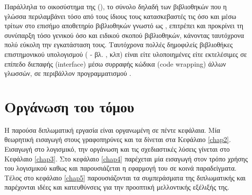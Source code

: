 Παράλληλα το οικοσύστημα της  (), το σύνολο δηλαδή των βιβλιοθηκών που η γλώσσα περιλαμβάνει τόσο από τους ίδιους τους κατασκεβαστές τις όσο και μέσω τρίτων στο επισήμο αποθετηρίο βιβλιοθηκών γνωστό ως , επιτρέπει και προκρίνει τη συνύπαρξη τόσο γενικού όσο και ειδικού σκοπού βιβλιοθηκών, κάνοντας ταυτόχρονα πολύ εύκολη την εγκατάσταση τους.
Ταυτόχρονα πολλές δημοφιλείς βιβλιοθήκες επιστημονικού υπολογισμού ( - βλ. ,  κλπ) είναι είτε υλοποιημένες είτε εκτελέσιμες σε επίπεδο διεπαφής (interface) μέσω συρραφής κώδικα (code wrapping) άλλων γλωσσών, σε περιβάλλον προγραμματισμού .

\section{Οργάνωση του τόμου}

Η παρούσα διπλωματική εργασία είναι οργανωμένη σε πέντε κεφάλαια. Μία θεωρητική εισαγωγή στους γραφοπηρύνες και τα δίνεται στα Κεφάλαιο \ref{chap2}. Εισαγωγή στο λογισμικό, την οργάνωση και τις σχεδιαστικές λύσεις γίνεται στο Κεφάλαιο \ref{chap3}. Στο κεφάλαιο \ref{chap4} παρέχεται μία εισαγωγή στον τρόπο χρήσης του λογισμικού καθως και παρουσιάζεται η εφαρμογή του σε κοινά παραδείγματα. Τέλος στο κεφάλαιο \ref{chap5} παρουσιάζονται τα συμπεράσματα της διπλωματικής και παρέχονται ιδέες και κατευθύνσεις για την προοπτική μελλοντικής εξέλιξής της.
